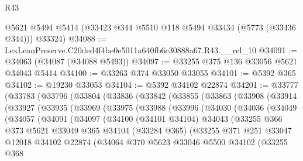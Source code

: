 \begin{lexlean}{R43}
\begin{coremodule}
      @5621
      @5494
      @5414
      (@33423 @344 @5510 @118 @5494 @33434 (@5773 (@33436 @344)))
      @33324)
@34088 := LexLeanPreserve.C20ded4f4be0e5011a640fb6c30888a67.R43.__rel_10
@34091 := @34063 (@34087 (@34088 @5493))
@34097 := @33255 @375 @136 @33056 @5621 @34043 @5414
@34100 := @33263 @374 @33050 @33055
@34101 := @5392 @365
@34102 := @19230 @33053
@34104 := @5392 @34102 @22874
@34201 := @33777
    (@33783
      (@33796
        (@33804
          (@33836
            (@33842
              (@33855
                (@33863
                  (@33908
                    (@33914
                      (@33927
                        (@33935
                          (@33969
                            (@33975
                              (@33988
                                (@33996
                                  (@34030
                                    (@34036
                                      (@34049
                                        (@34057
                                          (@34091
                                            (@34097
                                              (@34100
                                                (@34101 @34104)
                                                @34043
                                                (@33255
                                                  @366
                                                  @373
                                                  @5621
                                                  @33049
                                                  @365
                                                  @34104
                                                  (@33284 @365)
                                                  (@33255
                                                    @371
                                                    @251
                                                    @33047
                                                    @12018
                                                    @34102
                                                    @22874
                                                    (@34064
                                                      @370
                                                      @5623
                                                      @33046
                                                      @5500
                                                      @34102
                                                      (@33255
                                                        @368

\end{coremodule}
\end{lexlean}
